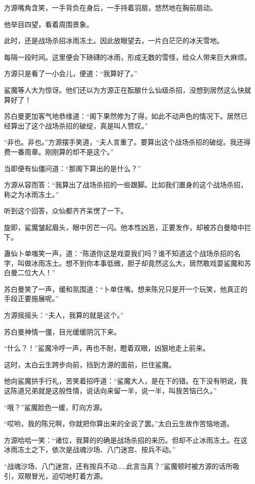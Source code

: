 \begin{this_body}
方源嘴角含笑，一手背负在身后，一手持着羽扇，悠然地在胸前扇动。

他举目四望，看着周围景象。

此时，还是战场杀招冰雨冻土。因此放眼望去，一片白茫茫的冰天雪地。

每隔一段时间。这里便会下磅礴的冰雨，形成无数的雪怪，给众人带来巨大麻烦。

方源只是看了一小会儿，便道：“我算好了。”

鲨魔等人大为惊讶。他们还以为方源正在酝酿什么仙级杀招，没想到居然这么快就算好了！

苏白曼更加客气地恭维道：“阁下果然修为了得，如此不动声色的情况下。居然已经算出了这个战场杀招的破绽，真是叫人赞叹。”

“非也。非也。”方源摆手笑道，“夫人言重了。要算出这个战场杀招的破绽。我还得费一番周章。刚刚算的却不是这个。”

当即便有仙僵问道：“那阁下算出的是什么？”

方源从容而答：“我算出了战场杀招的一些跟脚。比如我们置身的这个战场杀招，称之为冰雨冻土。”

听到这个回答，众仙都齐齐呆愣了一下。

旋即，鲨魔皱起眉头，眼中厉芒一闪。他本性凶恶，正要发作，却被苏白曼暗中拦下。

蛊仙卜单嗤笑一声，道：“陈道你这是戏耍我们吗？谁不知道这个战场杀招的名字，叫做冰雨冻土。想不到你本事低微，胆子却竟然这么大，居然敢戏耍鲨魔和苏白曼二位大人！”

苏白曼笑了一声，缓和氛围道：“卜单住嘴。想来陈兄只是开一个玩笑，他真正的手段正要施展呢。”

方源摇摇头：“夫人，我算的就是这个。”

苏白曼神情一僵，目光缓缓阴沉下来。

“什么？！”鲨魔冷哼一声，再也不耐，瞪着双眼，凶狠地走上前来。

这时，太白云生跨步向前，挡到方源的面前，拦住鲨魔。

他向鲨魔拱手行礼，苦笑着招呼道：“鲨魔大人，是在下的错。在下没有明说，我这陈道兄弟就是这般性情，说话向来留一半，说一半，叫我苦恼已久。”

“哦？”鲨魔脸色一缓，盯向方源。

“哎哟，我的陈兄啊，你就把你算出来的全说了罢。”太白云生故作苦恼地道。

方源哈哈一笑：“诸位，我算的的确是战场杀招的来历。但却不止冰雨冻土。在这冰雨冻土之下，依次是战魂沙场、八门迷宫、按兵不动。”

“战魂沙场、八门迷宫，还有按兵不动……此言当真？”鲨魔顿时被方源的话所吸引，双眼冒光，迫切地盯着方源。


\end{this_body}
